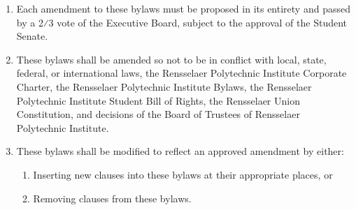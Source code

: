 \begin{enumerate}
\item Each amendment to these bylaws must be proposed in its entirety and passed by a 2⁄3 vote of the Executive Board, subject to the approval of the Student Senate.
\item These bylaws shall be amended so not to be in conflict with local, state, federal, or international laws, the Rensselaer Polytechnic Institute Corporate Charter, the Rensselaer Polytechnic Institute Bylaws, the Rensselaer Polytechnic Institute Student Bill of Rights, the Rensselaer Union Constitution, and decisions of the Board of Trustees of Rensselaer Polytechnic Institute.
\item These bylaws shall be modified to reflect an approved amendment by either:
\begin{enumerate}
\item Inserting new clauses into these bylaws at their appropriate places, or
\item Removing clauses from these bylaws.
\end{enumerate}
\end{enumerate}